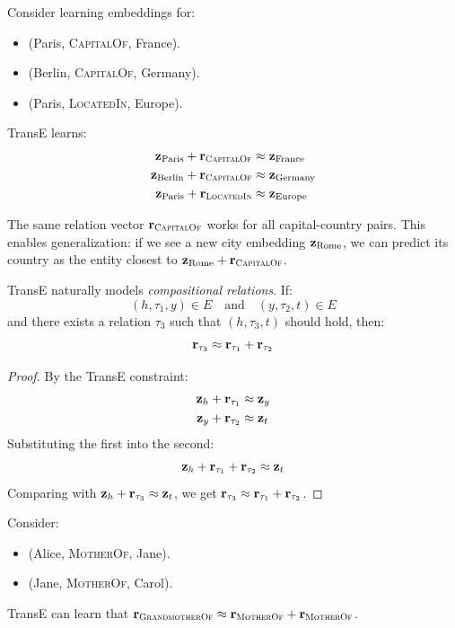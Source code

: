 \begin{notechapter}
\begin{example}
Consider learning embeddings for:
\begin{itemize}
    \item (Paris, \textsc{CapitalOf}, France).
    \item (Berlin, \textsc{CapitalOf}, Germany).
    \item (Paris, \textsc{LocatedIn}, Europe).
\end{itemize}

TransE learns:
\begin{align*}
\mathbf{z}_{\text{Paris}} + \mathbf{r}_{\textsc{CapitalOf}} &\approx \mathbf{z}_{\text{France}} \\
\mathbf{z}_{\text{Berlin}} + \mathbf{r}_{\textsc{CapitalOf}} &\approx \mathbf{z}_{\text{Germany}} \\
\mathbf{z}_{\text{Paris}} + \mathbf{r}_{\textsc{LocatedIn}} &\approx \mathbf{z}_{\text{Europe}}
\end{align*}

The same relation vector $\mathbf{r}_{\textsc{CapitalOf}}$ works for all capital-country pairs. This enables generalization: if we see a new city embedding $\mathbf{z}_{\text{Rome}}$, we can predict its country as the entity closest to $\mathbf{z}_{\text{Rome}} + \mathbf{r}_{\textsc{CapitalOf}}$.
\end{example}

\begin{proposition}
TransE naturally models \emph{compositional relations}. If:
\[
(h, \tau_1, y) \in E \quad \text{and} \quad (y, \tau_2, t) \in E
\]
and there exists a relation $\tau_3$ such that $(h, \tau_3, t)$ should hold, then:
\[
\mathbf{r}_{\tau_3} \approx \mathbf{r}_{\tau_1} + \mathbf{r}_{\tau_2}
\]
\end{proposition}

\begin{proof}
By the TransE constraint:
\begin{align*}
\mathbf{z}_h + \mathbf{r}_{\tau_1} &\approx \mathbf{z}_y \\
\mathbf{z}_y + \mathbf{r}_{\tau_2} &\approx \mathbf{z}_t
\end{align*}
Substituting the first into the second:
\[
\mathbf{z}_h + \mathbf{r}_{\tau_1} + \mathbf{r}_{\tau_2} \approx \mathbf{z}_t
\]
Comparing with $\mathbf{z}_h + \mathbf{r}_{\tau_3} \approx \mathbf{z}_t$, we get $\mathbf{r}_{\tau_3} \approx \mathbf{r}_{\tau_1} + \mathbf{r}_{\tau_2}$.
\end{proof}

\begin{example}
Consider:
\begin{itemize}
    \item (Alice, \textsc{MotherOf}, Jane).
    \item (Jane, \textsc{MotherOf}, Carol).
\end{itemize}
TransE can learn that $\mathbf{r}_{\textsc{GrandmotherOf}} \approx \mathbf{r}_{\textsc{MotherOf}} + \mathbf{r}_{\textsc{MotherOf}}$.


\end{example}
\end{notechapter}
